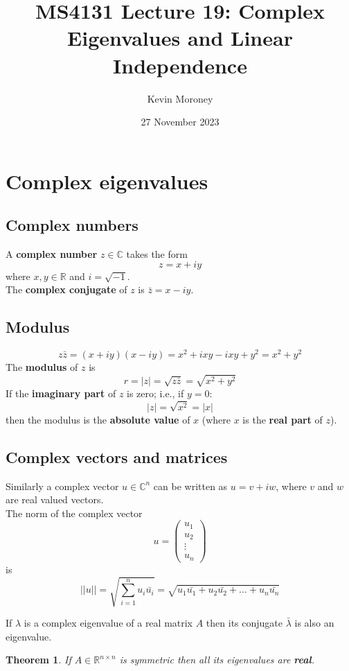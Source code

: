 \documentclass[a4paper, 12pt]{article}
\title{MS4131 Lecture 19: Complex Eigenvalues and Linear Independence}
\author{Kevin Moroney}
\date{27 November 2023}
\newtheorem{theorem}{Theorem}[section]
\newenvironment{remark}[1][Remark]{\begin{trivlist}
\item[\hskip \labelsep {\bfseries #1}]}{\end{trivlist}}
\newcommand{\keyword}[1]{\textbf{#1}}
\begin{document}
    \maketitle
    \section*{Complex eigenvalues}
    \subsection*{Complex numbers}
    A \keyword{complex number} $z \in \mathbb{C}$ takes the form
    \[z = x + iy\]
    where $x, y \in \mathbb{R}$ and $i = \sqrt{-1}$.\\
    The \keyword{complex conjugate} of $z$ is $\bar{z} = x - iy$.\\
    \subsection*{Modulus}
    \[z\bar{z} = (x + iy)(x - iy) = x^2 + ixy - ixy + y^2 = x^2 + y^2\]
    The \keyword{modulus} of $z$ is
    \[r = |z| = \sqrt{z\bar{z}} = \sqrt{x^2 + y^2}\]
    If the \keyword{imaginary part} of $z$ is zero; i.e., if $y = 0$:
    \[|z| = \sqrt{x^2} = |x|\]
    then the modulus is the \keyword{absolute value} of $x$ (where $x$ is the
    \keyword{real part} of $z$).
    \subsection*{Complex vectors and matrices}
    Similarly a complex vector $u \in \mathbb{C}^n$ can be written as $u = v + iw$,
    where $v$ and $w$ are real valued vectors.\\
    The norm of the complex vector
    \[
        u = \begin{pmatrix}
                u_1\\
                u_2\\
                \vdots\\
                u_n
            \end{pmatrix}
    \]
    is
    \[
        ||u|| = \sqrt{\sum_{i=1}^{n}u_i\bar{u_i}}
        = \sqrt{u_1\bar{u_1} + u_2\bar{u_2} + \dots + u_n\bar{u_n}}
    \]
    \begin{remark}
        If $\lambda$ is a complex eigenvalue of a real matrix $A$ then its
        conjugate $\bar{\lambda}$ is also an eigenvalue.
    \end{remark}
    \begin{theorem}
        If $A \in \mathbb{R}^{n \times n}$ is symmetric then all its eigenvalues are \keyword{real}.
    \end{theorem}
\end{document}

